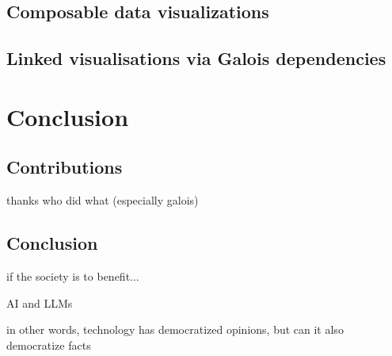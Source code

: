 \documentclass[fleqn,11pt]{report}
\theoremstyle{definition}
\begin{document}
\chapter{Composable data visualizations}
\label{ch:compost}

\chapter{Linked visualisations via Galois dependencies}
\label{ch:galois}

\part{Conclusion}

\chapter{Contributions}

thanks
who did what
(especially galois)

\chapter{Conclusion}

if the society is to benefit...

AI and LLMs

in other words, technology has democratized opinions, but can it also democratize facts


























%

\end{document}
